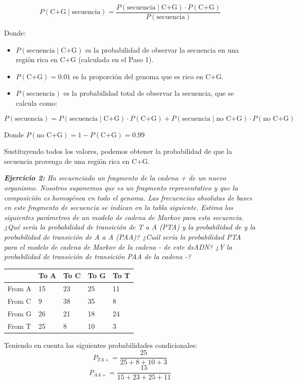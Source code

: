 \begin{itemize}
\[
P(\text{C+G} \mid \text{secuencia}) = \frac{P(\text{secuencia} \mid \text{C+G}) \cdot P(\text{C+G})}{P(\text{secuencia})}
\]

Donde:
\begin{itemize}
\item $ P(\text{secuencia} \mid \text{C+G}) $ es la probabilidad de observar la secuencia en una región rica en C+G (calculada en el Paso 1).
\item $ P(\text{C+G}) = 0{.}01 $ es la proporción del genoma que es rico en C+G.
\item $ P(\text{secuencia}) $ es la probabilidad total de observar la secuencia, que se calcula como:
\end{itemize}

\[
P(\text{secuencia}) = P(\text{secuencia} \mid \text{C+G}) \cdot P(\text{C+G}) + P(\text{secuencia} \mid \text{no C+G}) \cdot P(\text{no C+G})
\]

Donde $ P(\text{no C+G}) = 1 - P(\text{C+G}) = 0{.}99 $

Sustituyendo todos los valores, podemos obtener la probabilidad de que la secuencia provenga de una región rica en C+G.
\end{itemize}

\textit{\textbf{Ejercicio 2:} 
Ha secuenciado un fragmento de la cadena + de un nuevo organismo. Nosotros suponemos que es un fragmento representativo y que la composición es homogénea en todo el genoma. Las frecuencias absolutas de bases en este fragmento de secuencia se indican en la tabla siguiente. Estima los siguientes parámetros de un modelo de cadena de Markov para esta secuencia. ¿Qué sería la probabilidad de transición de T a A (PTA) y la probabilidad de y la probabilidad de transición de A a A (PAA)? ¿Cuál sería la probabilidad PTA para el modelo de cadena de Markov de la cadena - de este dsADN? ¿Y la probabilidad de transición de transición PAA de la cadena -?}
\begin{table}[htbp]
    \centering
    \begin{tabularx}{\textwidth}{ X | X X X X}
          & To A & To C & To G & To T \\ \hline
         From A & 15 & 23 & 25 & 11 \\
         From C & 9 & 38 & 35 & 8 \\
         From G & 26 & 21 & 18 & 24 \\
         From T & 25 & 8 & 10 & 3 \\
    \end{tabularx}
\end{table}
Teniendo en cuenta las siguientes probabilidades condicionales:
$$P_{TA+} = \frac{25}{25 + 8 + 10 + 3}$$
$$P_{AA+} = \frac{15}{15 + 23 + 25 + 11} $$

